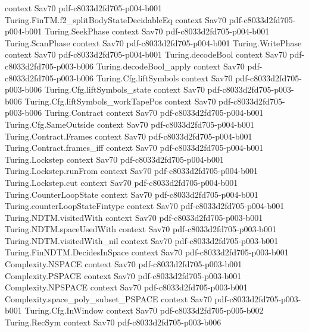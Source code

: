 \begin{theorem}
  {context}
  {Sav70}
  {pdf-c8033d2fd705-p004-b001}
\proofstep
  {Turing.FinTM.f2_splitBodyStateDecidableEq}
  {context}
  {Sav70}
  {pdf-c8033d2fd705-p004-b001}
\proofstep
  {Turing.SeekPhase}
  {context}
  {Sav70}
  {pdf-c8033d2fd705-p004-b001}
\proofstep
  {Turing.ScanPhase}
  {context}
  {Sav70}
  {pdf-c8033d2fd705-p004-b001}
\proofstep
  {Turing.WritePhase}
  {context}
  {Sav70}
  {pdf-c8033d2fd705-p004-b001}
\proofstep
  {Turing.decodeBool}
  {context}
  {Sav70}
  {pdf-c8033d2fd705-p003-b006}
\proofstep
  {Turing.decodeBool_apply}
  {context}
  {Sav70}
  {pdf-c8033d2fd705-p003-b006}
\proofstep
  {Turing.Cfg.liftSymbols}
  {context}
  {Sav70}
  {pdf-c8033d2fd705-p003-b006}
\proofstep
  {Turing.Cfg.liftSymbols_state}
  {context}
  {Sav70}
  {pdf-c8033d2fd705-p003-b006}
\proofstep
  {Turing.Cfg.liftSymbols_workTapePos}
  {context}
  {Sav70}
  {pdf-c8033d2fd705-p003-b006}
\proofstep
  {Turing.Contract}
  {context}
  {Sav70}
  {pdf-c8033d2fd705-p004-b001}
\proofstep
  {Turing.Cfg.SameOutside}
  {context}
  {Sav70}
  {pdf-c8033d2fd705-p004-b001}
\proofstep
  {Turing.Contract.Frames}
  {context}
  {Sav70}
  {pdf-c8033d2fd705-p004-b001}
\proofstep
  {Turing.Contract.frames_iff}
  {context}
  {Sav70}
  {pdf-c8033d2fd705-p004-b001}
\proofstep
  {Turing.Lockstep}
  {context}
  {Sav70}
  {pdf-c8033d2fd705-p004-b001}
\proofstep
  {Turing.Lockstep.runFrom}
  {context}
  {Sav70}
  {pdf-c8033d2fd705-p004-b001}
\proofstep
  {Turing.Lockstep.cut}
  {context}
  {Sav70}
  {pdf-c8033d2fd705-p004-b001}
\proofstep
  {Turing.CounterLoopState}
  {context}
  {Sav70}
  {pdf-c8033d2fd705-p004-b001}
\proofstep
  {Turing.counterLoopStateFintype}
  {context}
  {Sav70}
  {pdf-c8033d2fd705-p004-b001}
\proofstep
  {Turing.NDTM.visitedWith}
  {context}
  {Sav70}
  {pdf-c8033d2fd705-p003-b001}
\proofstep
  {Turing.NDTM.spaceUsedWith}
  {context}
  {Sav70}
  {pdf-c8033d2fd705-p003-b001}
\proofstep
  {Turing.NDTM.visitedWith_nil}
  {context}
  {Sav70}
  {pdf-c8033d2fd705-p003-b001}
\proofstep
  {Turing.FinNDTM.DecidesInSpace}
  {context}
  {Sav70}
  {pdf-c8033d2fd705-p003-b001}
\proofstep
  {Complexity.NSPACE}
  {context}
  {Sav70}
  {pdf-c8033d2fd705-p003-b001}
\proofstep
  {Complexity.PSPACE}
  {context}
  {Sav70}
  {pdf-c8033d2fd705-p003-b001}
\proofstep
  {Complexity.NPSPACE}
  {context}
  {Sav70}
  {pdf-c8033d2fd705-p003-b001}
\proofstep
  {Complexity.space_poly_subset_PSPACE}
  {context}
  {Sav70}
  {pdf-c8033d2fd705-p003-b001}
\proofstep
  {Turing.Cfg.InWindow}
  {context}
  {Sav70}
  {pdf-c8033d2fd705-p005-b002}
\proofstep
  {Turing.RecSym}
  {context}
  {Sav70}
  {pdf-c8033d2fd705-p003-b006}

\end{theorem}
